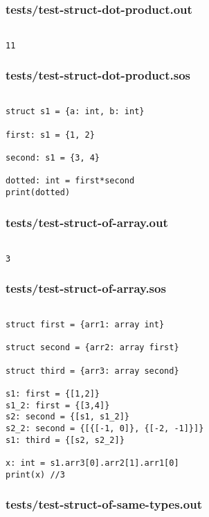 \documentclass[main.tex]{subfiles}
\begin{document}
\subsubsection{tests/test-struct-dot-product.out}

\begin{lstlisting}

11
\end{lstlisting}

\subsubsection{tests/test-struct-dot-product.sos}

\begin{lstlisting}

struct s1 = {a: int, b: int}

first: s1 = {1, 2}

second: s1 = {3, 4}

dotted: int = first*second
print(dotted)
\end{lstlisting}

\subsubsection{tests/test-struct-of-array.out}

\begin{lstlisting}

3
\end{lstlisting}

\subsubsection{tests/test-struct-of-array.sos}

\begin{lstlisting}

struct first = {arr1: array int}

struct second = {arr2: array first}

struct third = {arr3: array second}

s1: first = {[1,2]}
s1_2: first = {[3,4]}
s2: second = {[s1, s1_2]}
s2_2: second = {[{[-1, 0]}, {[-2, -1]}]}
s1: third = {[s2, s2_2]}

x: int = s1.arr3[0].arr2[1].arr1[0]
print(x) //3
\end{lstlisting}

\subsubsection{tests/test-struct-of-same-types.out}
\end{document}

